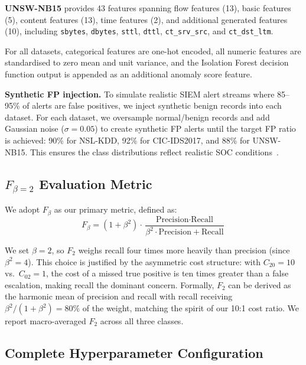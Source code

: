 \documentclass[conference]{IEEEtran}
\begin{document}
\textbf{UNSW-NB15} provides 43 features spanning flow features (13),
basic features (5), content features (13), time features (2), and additional
generated features (10), including \texttt{sbytes}, \texttt{dbytes},
\texttt{sttl}, \texttt{dttl}, \texttt{ct\_srv\_src}, and \texttt{ct\_dst\_ltm}.

For all datasets, categorical features are one-hot encoded, all numeric features
are standardised to zero mean and unit variance, and the Isolation Forest decision
function output is appended as an additional anomaly score feature.

\textbf{Synthetic FP injection.}  To simulate realistic SIEM alert streams where
85--95\% of alerts are false positives, we inject synthetic benign records into each
dataset. For each dataset, we oversample normal/benign records and add Gaussian noise
($\sigma = 0.05$) to create synthetic FP alerts until the target FP ratio is achieved:
90\% for NSL-KDD, 92\% for CIC-IDS2017, and 88\% for UNSW-NB15. This ensures the
class distributions reflect realistic SOC conditions~\cite{alahmadi2020,yang2024}.

\subsection{$F_{\beta=2}$ Evaluation Metric}
\label{sec:fbeta}

We adopt $F_{\beta}$ as our primary metric, defined as:
\begin{equation}
\label{eq:fbeta}
F_{\beta} = (1 + \beta^2) \cdot \frac{\text{Precision} \cdot \text{Recall}}
{\beta^2 \cdot \text{Precision} + \text{Recall}}
\end{equation}

We set $\beta = 2$, so $F_2$ weighs recall four times more heavily than precision
(since $\beta^2 = 4$).
This choice is justified by the asymmetric cost structure: with $C_{20}=10$ vs.\
$C_{02}=1$, the cost of a missed true positive is ten times greater than a false
escalation, making recall the dominant concern.
Formally, $F_2$ can be derived as the harmonic mean of precision and recall with
recall receiving $\beta^2/(1+\beta^2) = 80\%$ of the weight, matching the spirit
of our 10:1 cost ratio.
We report macro-averaged $F_2$ across all three classes.

\subsection{Complete Hyperparameter Configuration}
\label{sec:hyperparams}
\end{document}

